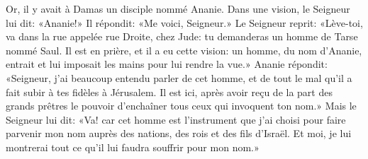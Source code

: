 Or, il y avait à Damas un disciple nommé Ananie.
Dans une vision, le Seigneur lui dit: «Ananie!»
	Il répondit: «Me voici, Seigneur.»
Le Seigneur reprit: «Lève-toi, va dans la rue appelée rue Droite, chez Jude:
	tu demanderas un homme de Tarse nommé Saul.
Il est en prière, et il a eu cette vision:
	un homme, du nom d’Ananie, entrait et lui imposait les mains pour lui rendre la vue.»
Ananie répondit: «Seigneur, j’ai beaucoup entendu parler de cet homme,
	et de tout le mal qu’il a fait subir à tes fidèles à Jérusalem.
Il est ici, après avoir reçu de la part des grands prêtres
		le pouvoir d’enchaîner tous ceux qui invoquent ton nom.»
Mais le Seigneur lui dit:
	«Va! car cet homme est l’instrument que j’ai choisi
	pour faire parvenir mon nom auprès des nations, des rois et des fils d’Israël.
Et moi, je lui montrerai tout ce qu’il lui faudra souffrir pour mon nom.»
